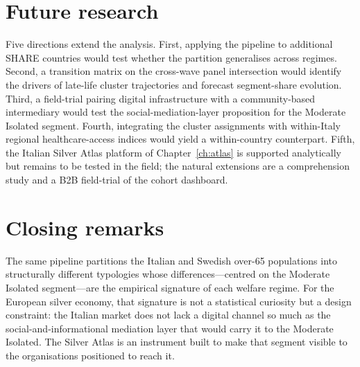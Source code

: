 \section{Future research}
\label{sec:ch9-future}

 Five directions extend the analysis. First, applying the pipeline to additional SHARE countries would test whether the partition generalises across regimes. Second, a transition matrix on the cross-wave panel intersection would identify the drivers of late-life cluster trajectories and forecast segment-share evolution. Third, a field-trial pairing digital infrastructure with a community-based intermediary would test the social-mediation-layer proposition for the Moderate Isolated segment. Fourth, integrating the cluster assignments with within-Italy regional healthcare-access indices would yield a within-country counterpart. Fifth, the Italian Silver Atlas platform of Chapter~\ref{ch:atlas} is supported analytically but remains to be tested in the field; the natural extensions are a comprehension study and a B2B field-trial of the cohort dashboard.

\section{Closing remarks}
\label{sec:ch9-closing}

\enlargethispage{3\baselineskip}
The same pipeline partitions the Italian and Swedish over-65 populations into structurally different typologies whose differences---centred on the Moderate Isolated segment---are the empirical signature of each welfare regime. For the European silver economy, that signature is not a statistical curiosity but a design constraint: the Italian market does not lack a digital channel so much as the social-and-informational mediation layer that would carry it to the Moderate Isolated. The Silver Atlas is an instrument built to make that segment visible to the organisations positioned to reach it.
